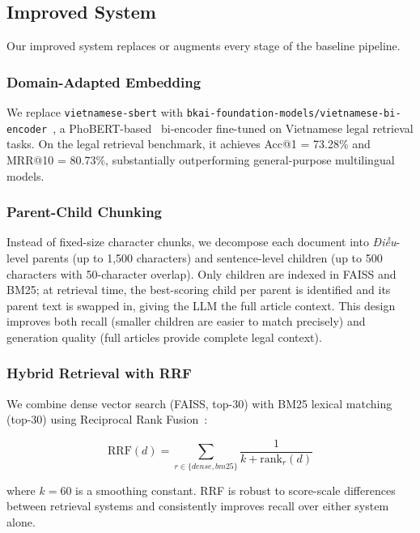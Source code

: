 \documentclass[conference]{IEEEtran}
\begin{document}
\subsection{Improved System}

Our improved system replaces or augments every stage of the baseline pipeline.

\subsubsection{Domain-Adapted Embedding}

We replace \texttt{vietnamese-sbert} with
\texttt{bkai-foundation-models/vietnamese-bi-encoder}~\cite{bkai},
a PhoBERT-based~\cite{phobert} bi-encoder fine-tuned on Vietnamese legal
retrieval tasks. On the legal retrieval benchmark, it achieves
Acc@1 = 73.28\% and MRR@10 = 80.73\%, substantially outperforming
general-purpose multilingual models.

\subsubsection{Parent-Child Chunking}

Instead of fixed-size character chunks, we decompose each document into
\emph{Điều}-level parents (up to 1,500 characters) and sentence-level children
(up to 500 characters with 50-character overlap). Only children are indexed in
FAISS and BM25; at retrieval time, the best-scoring child per parent is
identified and its parent text is swapped in, giving the LLM the full article
context. This design improves both recall (smaller children are easier to
match precisely) and generation quality (full articles provide complete legal
context).

\subsubsection{Hybrid Retrieval with RRF}

We combine dense vector search (FAISS, top-30) with BM25 lexical matching
(top-30) using Reciprocal Rank Fusion~\cite{cormack2009reciprocal}:

\begin{equation}
  \text{RRF}(d) = \sum_{r \in \{dense, bm25\}} \frac{1}{k + \text{rank}_r(d)}
\end{equation}

where $k=60$ is a smoothing constant. RRF is robust to score-scale differences
between retrieval systems and consistently improves recall over either system
alone.
\end{document}
